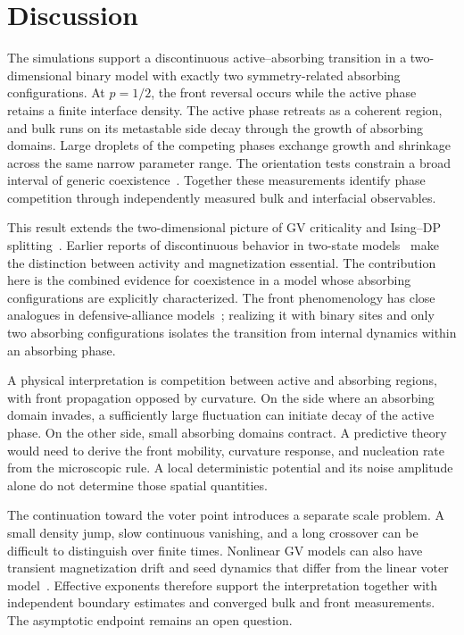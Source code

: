 \section{Discussion}
\label{sec:discussion}

The simulations support a discontinuous active--absorbing transition in a two-dimensional
binary model with exactly two symmetry-related absorbing configurations. At $p=1/2$, the
front reversal occurs while the active phase retains a finite interface density.
The active phase retreats as a coherent region, and bulk runs on its metastable side
decay through the growth of absorbing domains. Large droplets of the competing phases
exchange growth and shrinkage across the same narrow parameter range. The orientation
tests constrain a broad interval of generic coexistence~\cite{wang2015,liu2018}.
Together these measurements identify phase competition through independently measured
bulk and interfacial observables.

This result extends the two-dimensional picture of GV criticality and
Ising--DP splitting~\cite{dornic2001,droz2003,alhammal2005}. Earlier reports of discontinuous
behavior in two-state models~\cite{rodrigues2015} make the distinction between activity and
magnetization essential. The contribution here is the combined evidence for coexistence
in a model whose absorbing configurations are explicitly characterized.
The front phenomenology has close analogues in defensive-alliance
models~\cite{szabo2004,guisoni2013}; realizing it with binary sites and only two absorbing
configurations isolates the transition from internal dynamics within an absorbing phase.

A physical interpretation is competition between active and absorbing regions,
with front propagation opposed by curvature. On the side where an absorbing domain
invades, a sufficiently large fluctuation can initiate decay of the active phase.
On the other side, small absorbing domains contract.
A predictive theory would need to derive the front mobility, curvature response,
and nucleation rate from the microscopic rule. A local deterministic potential and
its noise amplitude alone do not determine those spatial quantities.

The continuation toward the voter point introduces a separate scale problem.
A small density jump, slow continuous vanishing, and a long crossover can be difficult
to distinguish over finite times. Nonlinear GV models can also have transient
magnetization drift and seed dynamics that differ from the linear voter
model~\cite{castellano2012,azizi2020}. Effective exponents therefore support the
interpretation together with independent boundary estimates and converged bulk and
front measurements. The asymptotic endpoint remains an open question.

